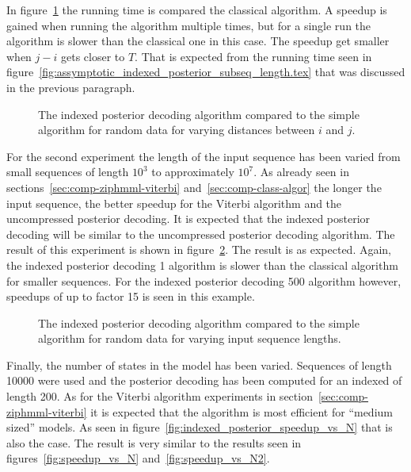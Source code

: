 In figure~\ref{fig:indexed_posterior_speedup_vs_subseq} the running time is
compared the classical algorithm. A speedup is gained when running the
algorithm multiple times, but for a single run the algorithm is slower than the
classical one in this case. The speedup get smaller when $j - i$ gets closer to
$T$. That is expected from the running time seen in
figure~\ref{fig:assymptotic_indexed_posterior_subseq_length.tex} that was
discussed in the previous paragraph.

\begin{figure}
  \centering
  
  \caption{The indexed posterior decoding algorithm compared to the simple
    algorithm for random data for varying distances between $i$ and $j$.}
  \label{fig:indexed_posterior_speedup_vs_subseq}
\end{figure}

For the second experiment the length of the input sequence has been varied from
small sequences of length $10^3$ to approximately $10^7$. As already seen in
sections~\ref{sec:comp-ziphmml-viterbi} and~\ref{sec:comp-class-algor} the
longer the input sequence, the better speedup for the Viterbi algorithm and the
uncompressed posterior decoding. It is expected that the indexed posterior
decoding will be similar to the uncompressed posterior decoding algorithm. The
result of this experiment is shown in
figure~\ref{fig:indexed_posterior_speedup_vs_T}. The result is as
expected. Again, the indexed posterior decoding 1 algorithm is slower than
the classical algorithm for smaller sequences. For the indexed posterior
decoding 500 algorithm however, speedups of up to factor 15 is seen in this
example.

\begin{figure}
  \centering
  
  \caption{The indexed posterior decoding algorithm compared to the simple
    algorithm for random data for varying input sequence lengths.}
  \label{fig:indexed_posterior_speedup_vs_T}
\end{figure}

Finally, the number of states in the model has been varied. Sequences of length
10000 were used and the posterior decoding has been computed for an indexed of
length 200. As for the Viterbi algorithm experiments in
section~\ref{sec:comp-ziphmml-viterbi} it is expected that the algorithm is
most efficient for ``medium sized'' models. As seen in
figure~\ref{fig:indexed_posterior_speedup_vs_N} that is also the case. The
result is very similar to the results seen in figures~\ref{fig:speedup_vs_N}
and~\ref{fig:speedup_vs_N2}.

